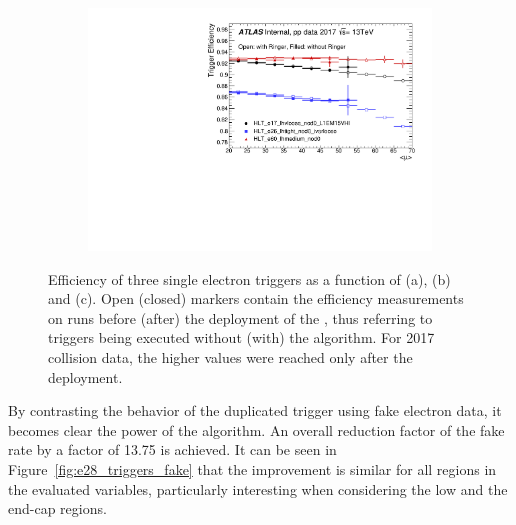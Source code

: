 \begin{figure}[h!tb]
\begin{center}
  \begin{subfigure}[c]{.58\textwidth}
  \centering
  \includegraphics[width=\textwidth]{sections/04_operation/figures/efficiencies/eff_EGAM1_e17_e26_e60_2017_before_and_after_ts1_mu.pdf}
  \caption{}%
  \end{subfigure}
  \caption{Efficiency of three single electron triggers as a function of \et (a), \eta (b) and \avgmu (c). Open (closed) markers contain the efficiency measurements on runs before (after) the deployment of the \rnn{}, thus referring to triggers being executed without (with) the \rnn{} algorithm. For 2017 collision data, the higher \avgmu{} values were reached only after the deployment.
  }%
  \label{fig:2017_ts1}
  \end{center}
\end{figure}


By contrasting the behavior of the duplicated trigger using fake electron data,
it becomes clear the power of the \rnn{} algorithm. An overall reduction factor of
the fake rate by a factor of 13.75 is achieved. It can be seen in
Figure~\ref{fig:e28_triggers_fake} that the improvement is similar for all
regions in the evaluated variables, particularly interesting when
considering the low \et{} and the end-cap regions.





